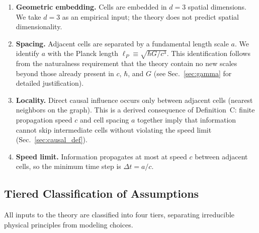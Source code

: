 \documentclass[aps,prd,twocolumn,showpacs,superscriptaddress,preprintnumbers]{revtex4-2}
\begin{document}
\begin{enumerate}
    \item \textbf{Geometric embedding.} Cells are embedded in $d=3$ spatial dimensions. We take $d=3$ as an empirical input; the theory does not predict spatial dimensionality.
    \item \textbf{Spacing.} Adjacent cells are separated by a fundamental length scale $a$. We identify $a$ with the Planck length $\ell_P\equiv\sqrt{\hbar G/c^3}$. This identification follows from the naturalness requirement that the theory contain no new scales beyond those already present in $c$, $\hbar$, and $G$ (see Sec.~\ref{sec:gamma} for detailed justification).
    \item \textbf{Locality.} Direct causal influence occurs only between adjacent cells (nearest neighbors on the graph). This is a derived consequence of Definition~C: finite propagation speed $c$ and cell spacing $a$ together imply that information cannot skip intermediate cells without violating the speed limit (Sec.~\ref{sec:causal_def}).
    \item \textbf{Speed limit.} Information propagates at most at speed $c$ between adjacent cells, so the minimum time step is $\Delta t = a/c$.
\end{enumerate}

\subsection{Tiered Classification of Assumptions}
\label{sec:tiered}

All inputs to the theory are classified into four tiers, separating irreducible physical principles from modeling choices.
\end{document}
